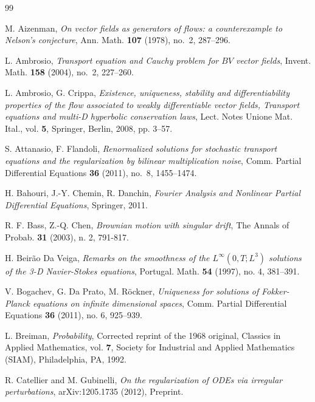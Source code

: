 \documentclass[a4paper,10pt]{article}
\begin{document}
\footnotesize

\begin{thebibliography}{99}                                                                                               

M. Aizenman, \textit{On vector fields as generators of flows: a counterexample to
  {N}elson's conjecture}, Ann. Math. \textbf{{\bf107}} (1978), no.~2, 287--296.

L. Ambrosio, \textit{Transport equation and {C}auchy problem for {$BV$} vector
  fields}, Invent. Math. \textbf{{\bf158}} (2004), no.~2, 227--260.

 L. Ambrosio, G. Crippa, \textit{Existence, uniqueness, stability and differentiability properties of the flow associated to weakly differentiable vector fields, Transport equations and multi-D hyperbolic conservation laws}, Lect. Notes Unione Mat. Ital., vol. \textbf{5}, Springer, Berlin, 2008, pp. 3--57.

 S. Attanasio, F. Flandoli, \textit{Renormalized solutions for stochastic transport equations and the regularization by bilinear multiplication noise}, Comm. Partial Differential Equations \textbf{36} (2011), no.~8, 1455--1474.

 H. Bahouri, J.-Y. Chemin, R. Danchin, \textit{Fourier Analysis and Nonlinear Partial Differential Equations}, Springer, 2011.

R. F. Bass, Z.-Q. Chen, \textit{Brownian motion with singular drift},
The Annals of Probab. \textbf{31} (2003), n. 2, 791-817.

H. Beir\~{a}o Da Veiga, \textit{Remarks on the smoothness of the $L^{\infty
}(0,T;L^{3})$ solutions of the 3-D Navier-Stokes equations}, Portugal.
Math. \textbf{54} (1997), no. 4, 381--391.

 V. Bogachev, G. Da Prato, M. R\"{o}ckner, \textit{Uniqueness for solutions of Fokker-Planck equations on infinite dimensional spaces}, Comm. Partial
Differential Equations \textbf{36} (2011), no. 6, 925--939.

 L. Breiman, \textit{Probability}, Corrected reprint of the 1968 original, Classics in Applied Mathematics, vol. \textbf{7}, Society for Industrial and Applied Mathematics (SIAM), Philadelphia, PA, 1992.

R. Catellier and M. Gubinelli, \textit{On the regularization of {ODEs} via irregular perturbations}, arXiv:1205.1735 (2012), Preprint.


\end{thebibliography}
\end{document}
